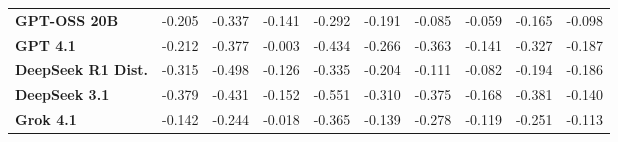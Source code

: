 \begin{table}[h]
{\begin{tabular}{@{}lccccccccc@{}}
\textbf{GPT-OSS 20B} & -0.205 & -0.337 & -0.141 & -0.292 & -0.191 & -0.085 & -0.059 & -0.165 & -0.098 \\
\textbf{GPT 4.1} & -0.212 & -0.377 & -0.003 & -0.434 & -0.266 & -0.363 & -0.141 & -0.327 & -0.187 \\
\textbf{DeepSeek R1 Dist.} & -0.315 & -0.498 & -0.126 & -0.335 & -0.204 & -0.111 & -0.082 & -0.194 & -0.186 \\
\textbf{DeepSeek 3.1} & -0.379 & -0.431 & -0.152 & -0.551 & -0.310 & -0.375 & -0.168 & -0.381 & -0.140 \\
\textbf{Grok 4.1} & -0.142 & -0.244 & -0.018 & -0.365 & -0.139 & -0.278 & -0.119 & -0.251 & -0.113 \\
\bottomrule
\end{tabular}
}
\end{table}
